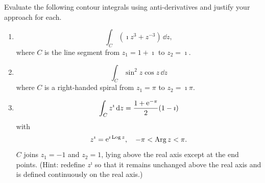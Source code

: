 {\begin{Exercise}
\end{Exercise}







\begin{Exercise}
  \label{exercise anti derivatives iz3 z-3}
  Evaluate the following contour integrals using anti-derivatives and justify
  your approach for each.
  \begin{enumerate}
  \item 
    \[
    \int_C \left( \imath z^3 + z^{-3} \right)\,\dd z,
    \]
    where $C$ is the line segment from $z_1 = 1 + \imath$ to $z_2 = \imath$.
  \item 
    \[
    \int_C \sin^2 z \cos z \,\dd z
    \]
    where $C$ is a right-handed spiral from $z_1 = \pi$ to $z_2 = \imath \pi$.
  \item 
    \[
    \int_C z^\imath \,\mathrm{d} z = \frac{1 + \mathop{\mathrm{e}}\nolimits^{-\pi}}{2}  (1 - \imath)
    \]
    with
    \[
    z^\imath = \mathop{\mathrm{e}}\nolimits^{\imath \mathop{\mathrm{Log}}\nolimits z}, \quad -\pi < \mathop{\mathrm{Arg}}\nolimits z < \pi.
    \]
    $C$ joins $z_1 = -1$ and $z_2 = 1$, lying above the real axis except at the 
    end points.  (Hint: redefine $z^\imath$ so that it remains unchanged above the 
    real axis and is defined continuously on the real axis.)
  \end{enumerate}

\end{Exercise}










\raggedbottom
}
